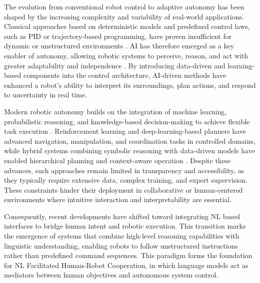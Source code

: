 
The evolution from conventional robot control to adaptive autonomy has been shaped by the increasing complexity and variability of real-world applications. Classical approaches based on deterministic models and predefined control laws, such as PID or trajectory-based programming, have proven insufficient for dynamic or unstructured environments \cite{isreal2025rise}. AI has therefore emerged as a key enabler of autonomy, allowing robotic systems to perceive, reason, and act with greater adaptability and independence \cite{machines13070615,pandy2025ai}. By introducing data-driven and learning-based components into the control architecture, AI-driven methods have enhanced a robot’s ability to interpret its surroundings, plan actions, and respond to uncertainty in real time.

Modern robotic autonomy builds on the integration of machine learning, probabilistic reasoning, and knowledge-based decision-making to achieve flexible task execution \cite{isreal2025rise,machines13070615}. Reinforcement learning and deep-learning-based planners have advanced navigation, manipulation, and coordination tasks in controlled domains, while hybrid systems combining symbolic reasoning with data-driven models have enabled hierarchical planning and context-aware operation \cite{pandy2025ai}. Despite these advances, such approaches remain limited in transparency and accessibility, as they typically require extensive data, complex training, and expert supervision. These constraints hinder their deployment in collaborative or human-centered environments where intuitive interaction and interpretability are essential.

Consequently, recent developments have shifted toward integrating NL based interfaces to bridge human intent and robotic execution. This transition marks the emergence of systems that combine high-level reasoning capabilities with linguistic understanding, enabling robots to follow unstructured instructions rather than predefined command sequences. This paradigm forms the foundation for NL Facilitated Human-Robot Cooperation, in which language models act as mediators between human objectives and autonomous system control.

